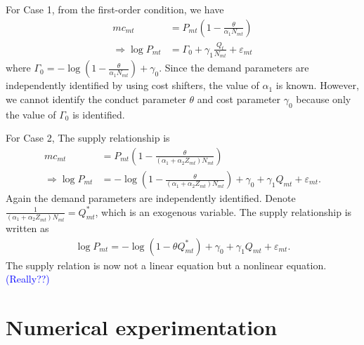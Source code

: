 \documentclass[11pt]{article}
\begin{document}
For Case 1, from the first-order condition, we have
    \begin{align*}
        mc_{mt}& = P_{mt}\left( 1-\frac{\theta}{\alpha_1 N_{mt}} \right)\\
        \Longrightarrow\log P_{mt}  &=  \Gamma_0 + \gamma_1 \frac{Q_t}{N_{mt}} +\varepsilon_{mt} 
    \end{align*}
    where $\Gamma_0 = -\log \left( 1-\frac{\theta}{\alpha_1 N_{mt}} \right) +\gamma_0$.
    Since the demand parameters are independently identified by using cost shifters, the value of $\alpha_1$ is known. However, we cannot identify the conduct parameter $\theta$ and cost parameter $\gamma_0$ because only the value of $\Gamma_0$ is identified.

For Case 2, The supply relationship is 
    \begin{align*}
            mc_{mt}& = P_{mt}\left(  1 - \frac{\theta}{(\alpha_1+\alpha_2 Z_{mt})N_{mt}} \right)\\
            \Longrightarrow \log P_{mt}& = -\log \left(  1 - \frac{\theta}{(\alpha_1+\alpha_2 Z_{mt})N_{mt}} \right) +\gamma_0 + \gamma_1 Q_{mt} + \varepsilon_{mt}. 
    \end{align*}
    Again the demand parameters are independently identified. Denote $\frac{1}{(\alpha_1+\alpha_2 Z_{mt})N_{mt}} = Q^*_{mt}$, which is an exogenous variable. The supply relationship is written as 
    \begin{align*}
        \log P_{mt} = -\log \left(  1 - \theta Q^*_{mt} \right) +\gamma_0 + \gamma_1 Q_{mt} + \varepsilon_{mt}. 
    \end{align*}
    The supply relation is now not a linear equation but a nonlinear equation.\textcolor{blue}{(Really??)}

\section{Numerical experimentation}
\end{document}
